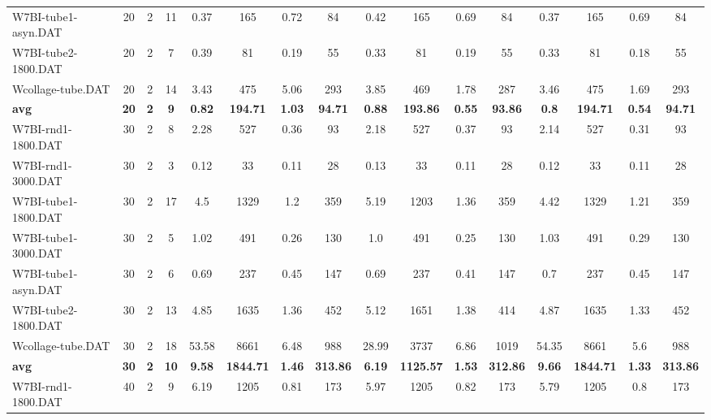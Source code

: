 \begin{sidewaystable}[!ht]
{\begin{tabular}{lccccccccccccccc}
W7BI-tube1-asyn.DAT & 20 & 2 & 11 &  \textcolor{blue2}{0.37} & 165 & 0.72 & 84 & 0.42 & 165 & 0.69 & 84 &  \textcolor{blue2}{0.37} & 165 & 0.69 & 84 \\
W7BI-tube2-1800.DAT & 20 & 2 & 7 & 0.39 & 81 & 0.19 & 55 & 0.33 & 81 & 0.19 & 55 & 0.33 & 81 &  \textcolor{blue2}{0.18} & 55 \\
Wcollage-tube.DAT & 20 & 2 & 14 & 3.43 & 475 & 5.06 & 293 & 3.85 & 469 & 1.78 & 287 & 3.46 & 475 &  \textcolor{blue2}{1.69} & 293 \\
\cline{1-16} \textbf{avg} & \textbf{20} & \textbf{2} & \textbf{9} & \textbf{0.82} & \textbf{194.71} & \textbf{1.03} & \textbf{94.71} & \textbf{0.88} & \textbf{193.86} & \textbf{0.55} & \textbf{93.86} & \textbf{0.8} & \textbf{194.71} & \textbf{0.54} & \textbf{94.71} \\ \cline{1-16}
W7BI-rnd1-1800.DAT & 30 & 2 & 8 & 2.28 & 527 & 0.36 & 93 & 2.18 & 527 & 0.37 & 93 & 2.14 & 527 &  \textcolor{blue2}{0.31} & 93 \\
W7BI-rnd1-3000.DAT & 30 & 2 & 3 & 0.12 & 33 &  \textcolor{blue2}{0.11} & 28 & 0.13 & 33 &  \textcolor{blue2}{0.11} & 28 & 0.12 & 33 &  \textcolor{blue2}{0.11} & 28 \\
W7BI-tube1-1800.DAT & 30 & 2 & 17 & 4.5 & 1329 &  \textcolor{blue2}{1.2} & 359 & 5.19 & 1203 & 1.36 & 359 & 4.42 & 1329 & 1.21 & 359 \\
W7BI-tube1-3000.DAT & 30 & 2 & 5 & 1.02 & 491 & 0.26 & 130 & 1.0 & 491 &  \textcolor{blue2}{0.25} & 130 & 1.03 & 491 & 0.29 & 130 \\
W7BI-tube1-asyn.DAT & 30 & 2 & 6 & 0.69 & 237 & 0.45 & 147 & 0.69 & 237 &  \textcolor{blue2}{0.41} & 147 & 0.7 & 237 & 0.45 & 147 \\
W7BI-tube2-1800.DAT & 30 & 2 & 13 & 4.85 & 1635 & 1.36 & 452 & 5.12 & 1651 & 1.38 & 414 & 4.87 & 1635 &  \textcolor{blue2}{1.33} & 452 \\
Wcollage-tube.DAT & 30 & 2 & 18 & 53.58 & 8661 & 6.48 & 988 & 28.99 & 3737 & 6.86 & 1019 & 54.35 & 8661 &  \textcolor{blue2}{5.6} & 988 \\
\cline{1-16} \textbf{avg} & \textbf{30} & \textbf{2} & \textbf{10} & \textbf{9.58} & \textbf{1844.71} & \textbf{1.46} & \textbf{313.86} & \textbf{6.19} & \textbf{1125.57} & \textbf{1.53} & \textbf{312.86} & \textbf{9.66} & \textbf{1844.71} & \textbf{1.33} & \textbf{313.86} \\ \cline{1-16}
W7BI-rnd1-1800.DAT & 40 & 2 & 9 & 6.19 & 1205 & 0.81 & 173 & 5.97 & 1205 & 0.82 & 173 & 5.79 & 1205 &  \textcolor{blue2}{0.8} & 173 \\

\end{tabular}}
\end{sidewaystable}

